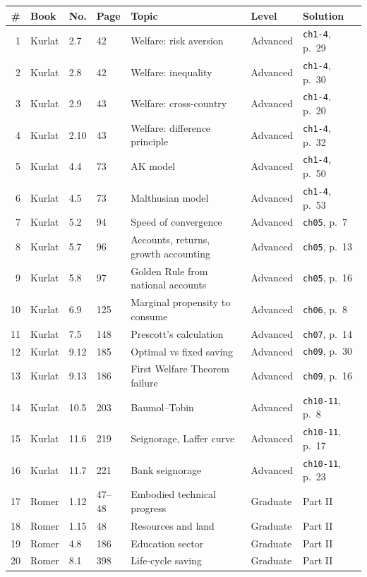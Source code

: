 \documentclass[11pt,a4paper]{article}
\begin{document}
{\small
\begin{longtable}{@{}rllllll@{}}
\toprule
\# & Book & No. & Page & Topic & Level & Solution \\
\midrule
\endhead
1 & Kurlat & 2.7 & 42 & Welfare: risk aversion & Advanced & \texttt{ch1-4}, p.~29 \\
2 & Kurlat & 2.8 & 42 & Welfare: inequality & Advanced & \texttt{ch1-4}, p.~30 \\
3 & Kurlat & 2.9 & 43 & Welfare: cross-country & Advanced & \texttt{ch1-4}, p.~20 \\
4 & Kurlat & 2.10 & 43 & Welfare: difference principle & Advanced & \texttt{ch1-4}, p.~32 \\
5 & Kurlat & 4.4 & 73 & AK model & Advanced & \texttt{ch1-4}, p.~50 \\
6 & Kurlat & 4.5 & 73 & Malthusian model & Advanced & \texttt{ch1-4}, p.~53 \\
7 & Kurlat & 5.2 & 94 & Speed of convergence & Advanced & \texttt{ch05}, p.~7 \\
8 & Kurlat & 5.7 & 96 & Accounts, returns, growth accounting & Advanced & \texttt{ch05}, p.~13 \\
9 & Kurlat & 5.8 & 97 & Golden Rule from national accounts & Advanced & \texttt{ch05}, p.~16 \\
10 & Kurlat & 6.9 & 125 & Marginal propensity to consume & Advanced & \texttt{ch06}, p.~8 \\
11 & Kurlat & 7.5 & 148 & Prescott's calculation & Advanced & \texttt{ch07}, p.~14 \\
12 & Kurlat & 9.12 & 185 & Optimal vs fixed saving & Advanced & \texttt{ch09}, p.~30 \\
13 & Kurlat & 9.13 & 186 & First Welfare Theorem failure & Advanced & \texttt{ch09}, p.~16 \\
14 & Kurlat & 10.5 & 203 & Baumol--Tobin & Advanced & \texttt{ch10-11}, p.~8 \\
15 & Kurlat & 11.6 & 219 & Seignorage, Laffer curve & Advanced & \texttt{ch10-11}, p.~17 \\
16 & Kurlat & 11.7 & 221 & Bank seignorage & Advanced & \texttt{ch10-11}, p.~23 \\
17 & Romer & 1.12 & 47--48 & Embodied technical progress & Graduate & Part II \\
18 & Romer & 1.15 & 48 & Resources and land & Graduate & Part II \\
19 & Romer & 4.8 & 186 & Education sector & Graduate & Part II \\
20 & Romer & 8.1 & 398 & Life-cycle saving & Graduate & Part II \\

\end{longtable}}
\end{document}
